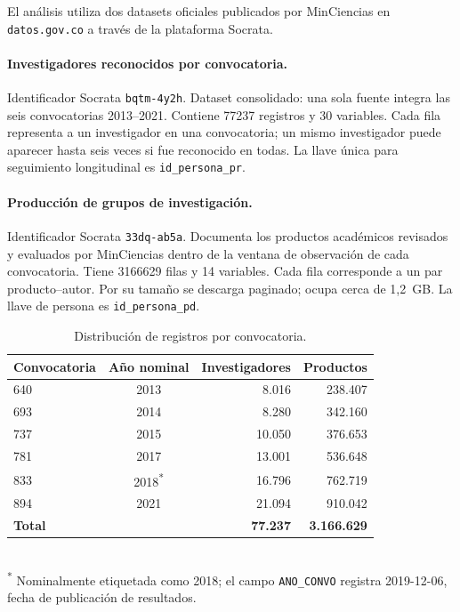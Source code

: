 \documentclass[11pt,a4paper,oneside]{article}
\begin{document}
El análisis utiliza dos datasets oficiales publicados por MinCiencias en \texttt{datos.gov.co} a través de la plataforma Socrata.

\paragraph{Investigadores reconocidos por convocatoria.}
Identificador Socrata \texttt{bqtm-4y2h}. Dataset consolidado: una sola fuente integra las seis convocatorias 2013--2021. Contiene \num{77237} registros y 30 variables. Cada fila representa a un investigador en una convocatoria; un mismo investigador puede aparecer hasta seis veces si fue reconocido en todas. La llave única para seguimiento longitudinal es \texttt{id\_persona\_pr}.

\paragraph{Producción de grupos de investigación.}
Identificador Socrata \texttt{33dq-ab5a}. Documenta los productos académicos revisados y evaluados por MinCiencias dentro de la ventana de observación de cada convocatoria. Tiene \num{3166629} filas y 14 variables. Cada fila corresponde a un par producto--autor. Por su tamaño se descarga paginado; ocupa cerca de 1{,}2~GB. La llave de persona es \texttt{id\_persona\_pd}.

\medskip
\begin{table}[h]
\centering
\caption{Distribución de registros por convocatoria.}
\label{tab:convocatorias}
\small
\begin{tabular}{l c r r}
\toprule
\textbf{Convocatoria} & \textbf{Año nominal} & \textbf{Investigadores} & \textbf{Productos} \\
\midrule
640 & 2013 & 8.016 & 238.407 \\
693 & 2014 & 8.280 & 342.160 \\
737 & 2015 & 10.050 & 376.653 \\
781 & 2017 & 13.001 & 536.648 \\
833 & 2018\textsuperscript{*} & 16.796 & 762.719 \\
894 & 2021 & 21.094 & 910.042 \\
\midrule
\textbf{Total} &  & \textbf{77.237} & \textbf{3.166.629} \\
\bottomrule
\end{tabular}\\[0.4em]
{\footnotesize\color{rule}\textsuperscript{*} Nominalmente etiquetada como 2018; el campo \texttt{ANO\_CONVO} registra 2019-12-06, fecha de publicación de resultados.}
\end{table}
\end{document}
